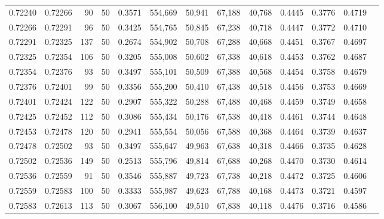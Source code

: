 \begin{tabular}{rrrrrrrrrrrrr}
0.72240 & 0.72266 &    90 &  50 &                                     0.3571 & 554,669 &  50,941 &  67,188 &  40,768 & 0.4445 & 0.3776 & 0.4719 \\
0.72266 & 0.72291 &    96 &  50 &                                     0.3425 & 554,765 &  50,845 &  67,238 &  40,718 & 0.4447 & 0.3772 & 0.4710 \\
0.72291 & 0.72325 &   137 &  50 &                                     0.2674 & 554,902 &  50,708 &  67,288 &  40,668 & 0.4451 & 0.3767 & 0.4697 \\
0.72325 & 0.72354 &   106 &  50 &                                     0.3205 & 555,008 &  50,602 &  67,338 &  40,618 & 0.4453 & 0.3762 & 0.4687 \\
0.72354 & 0.72376 &    93 &  50 &                                     0.3497 & 555,101 &  50,509 &  67,388 &  40,568 & 0.4454 & 0.3758 & 0.4679 \\
0.72376 & 0.72401 &    99 &  50 &                                     0.3356 & 555,200 &  50,410 &  67,438 &  40,518 & 0.4456 & 0.3753 & 0.4669 \\
0.72401 & 0.72424 &   122 &  50 &                                     0.2907 & 555,322 &  50,288 &  67,488 &  40,468 & 0.4459 & 0.3749 & 0.4658 \\
0.72425 & 0.72452 &   112 &  50 &                                     0.3086 & 555,434 &  50,176 &  67,538 &  40,418 & 0.4461 & 0.3744 & 0.4648 \\
0.72453 & 0.72478 &   120 &  50 &                                     0.2941 & 555,554 &  50,056 &  67,588 &  40,368 & 0.4464 & 0.3739 & 0.4637 \\
0.72478 & 0.72502 &    93 &  50 &                                     0.3497 & 555,647 &  49,963 &  67,638 &  40,318 & 0.4466 & 0.3735 & 0.4628 \\
0.72502 & 0.72536 &   149 &  50 &                                     0.2513 & 555,796 &  49,814 &  67,688 &  40,268 & 0.4470 & 0.3730 & 0.4614 \\
0.72536 & 0.72559 &    91 &  50 &                                     0.3546 & 555,887 &  49,723 &  67,738 &  40,218 & 0.4472 & 0.3725 & 0.4606 \\
0.72559 & 0.72583 &   100 &  50 &                                     0.3333 & 555,987 &  49,623 &  67,788 &  40,168 & 0.4473 & 0.3721 & 0.4597 \\
0.72583 & 0.72613 &   113 &  50 &                                     0.3067 & 556,100 &  49,510 &  67,838 &  40,118 & 0.4476 & 0.3716 & 0.4586 \\

\end{tabular}
